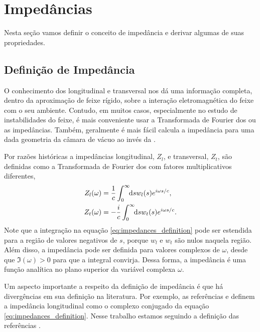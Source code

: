 \section{Impedâncias}

Nesta seção vamos definir o conceito de impedância e derivar algumas de suas propriedades.

\subsection{Definição de Impedância}
O conhecimento dos  longitudinal e transversal nos dá uma informação completa, dentro da aproximação de feixe rígido, sobre a interação eletromagnética do feixe com o seu ambiente. Contudo, em muitos casos, especialmente no estudo de instabilidades do feixe, é mais conveniente usar a Transformada de Fourier dos  ou as impedâncias. Também, geralmente é mais fácil calcula a impedância para uma dada geometria da câmara de vácuo ao invés da .

Por razões históricas a impedâncias longitudinal, $Z_l$, e transversal, $Z_t$, são definidas como a Transformada de Fourier dos  com fatores multiplicativos diferentes,
\begin{equation}\label{eq:impedances_definition}\begin{aligned}
Z_l(\omega) &= \frac1c \defint{s}{w_l(s)e^{i\omega s/c}}{0}{\infty},\\
Z_t(\omega) &= -\frac{i}{c} \defint{s}{w_t(s)e^{i\omega s/c}}{0}{\infty}.
\end{aligned}\end{equation}
Note que a integração na equação \eqref{eq:impedances_definition} pode ser estendida para a região de valores negativos de $s$, porque $w_l$ e $w_t$ são nulos naquela região. Além disso, a impedância pode ser definida para valores complexos de $\omega$, desde que $\Im(\omega) > 0 $ para que a integral convirja. Dessa forma, a impedância é uma função analítica no plano superior da variável complexa $\omega$.

Um aspecto importante a respeito da definição de impedância é que há divergências em sua definição na literatura. Por exemplo, as referências \cite{Zotter1993} e \cite{Wilson1987} definem a impedância longitudinal como o complexo conjugado da equação \eqref{eq:impedances_definition}. Nesse trabalho estamos seguindo a definição das referências \cite{CHao1993,Stupakov2000a,Heifets1991}.

